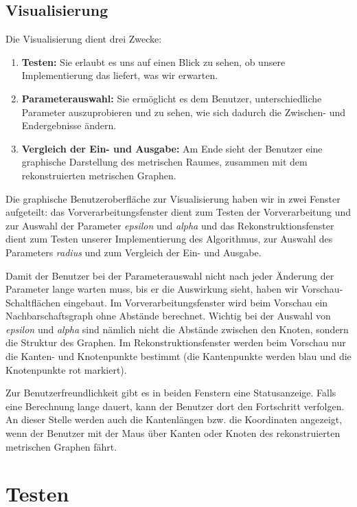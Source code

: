 \documentclass[parskip=half,
 fontsize=12pt, bibtotoc,
 ngerman]
 {article}
\begin{document}
\subsection{Visualisierung}

Die Visualisierung dient drei Zwecke:

\begin{enumerate}
\item \textbf{Testen:} Sie erlaubt es uns auf einen Blick zu sehen, ob unsere Implementierung das liefert, was wir erwarten.
\item \textbf{Parameterauswahl:} Sie ermöglicht es dem Benutzer, unterschiedliche Parameter auszuprobieren und zu sehen, wie sich dadurch die Zwischen- und Endergebnisse ändern.
\item \textbf{Vergleich der Ein- und Ausgabe:} Am Ende sieht der Benutzer eine graphische Darstellung des metrischen Raumes, zusammen mit dem rekonstruierten metrischen Graphen.
\end{enumerate}

Die graphische Benutzeroberfläche zur Visualisierung haben wir in zwei Fenster aufgeteilt: das Vorverarbeitungsfenster dient zum Testen der Vorverarbeitung und zur Auswahl der Parameter \emph{epsilon} und \emph{alpha} und das Rekonstruktionsfenster dient zum Testen unserer Implementierung des Algorithmus, zur Auswahl des Parameters \emph{radius} und zum Vergleich der Ein- und Ausgabe.

Damit der Benutzer bei der Parameterauswahl nicht nach jeder Änderung der Parameter lange warten muss, bis er die Auswirkung sieht, haben wir Vorschau-Schaltflächen eingebaut. Im Vorverarbeitungsfenster wird beim Vorschau ein Nachbarschaftsgraph ohne Abstände berechnet. Wichtig bei der Auswahl von \emph{epsilon} und \emph{alpha} sind nämlich nicht die Abstände zwischen den Knoten, sondern die Struktur des Graphen. Im Rekonstruktionsfenster werden beim Vorschau nur die Kanten- und Knotenpunkte bestimmt (die Kantenpunkte werden blau und die Knotenpunkte rot markiert).

Zur Benutzerfreundlichkeit gibt es in beiden Fenstern eine Statusanzeige. Falls eine Berechnung lange dauert, kann der Benutzer dort den Fortschritt verfolgen. An dieser Stelle werden auch die Kantenlängen bzw. die Koordinaten angezeigt, wenn der Benutzer mit der Maus über Kanten oder Knoten des rekonstruierten metrischen Graphen fährt.

\section{Testen}
\end{document}
